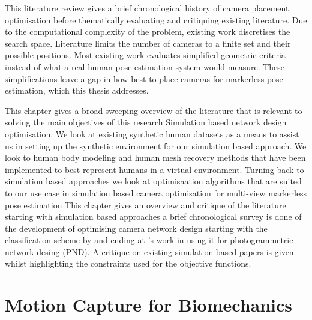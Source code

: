 \label{chap:literature}

This literature review gives a brief chronological history of camera placement optimisation before thematically evaluating and critiquing existing literature. Due to the computational complexity of the problem, existing work discretises the search space. Literature limits the number of cameras to a finite set and their possible positions. Most existing work evaluates simplified geometric criteria instead of what a real human pose estimation system would measure. These simplifications leave a gap in how best to place cameras for markerless pose estimation, which this thesis addresses.

This chapter gives a broad sweeping overview of the literature that is relevant to solving the main objectives of this research
Simulation based network design optimisation. We look at existing synthetic human datasets as a means to assist us in setting up the synthetic environment for our simulation based approach. We look to human body modeling and human mesh recovery methods that have been implemented to best represent humans in a virtual environment. Turning back to simulation based approaches we look at optimisaation algorithms that are suited to our use case in simulation based camera optimisation for multi-view markerless pose estimation 
This chapter gives an overview and critique of the literature starting with simulation based approaches a brief chronological survey is done of the development of optimising camera network design starting with the classification scheme by \citet{grafarend1974optimization} and ending at \citet{mason1995expert}'s work in using it for photogrammetric network desing (PND). A critique on existing simulation based papers is given whilst highlighting the constraints used for the objective functions.

\section{Motion Capture for Biomechanics}

